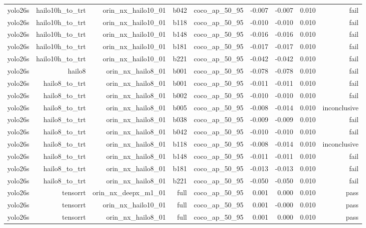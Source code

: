 \begin{table}[t]
\begin{tabular}{lrrrrrrrr}
yolo26s & hailo10h\_to\_trt & orin\_nx\_hailo10\_01 & b042 & coco\_ap\_50\_95 & -0.007 & -0.007 & 0.010 & fail \\
yolo26s & hailo10h\_to\_trt & orin\_nx\_hailo10\_01 & b118 & coco\_ap\_50\_95 & -0.010 & -0.010 & 0.010 & fail \\
yolo26s & hailo10h\_to\_trt & orin\_nx\_hailo10\_01 & b148 & coco\_ap\_50\_95 & -0.016 & -0.016 & 0.010 & fail \\
yolo26s & hailo10h\_to\_trt & orin\_nx\_hailo10\_01 & b181 & coco\_ap\_50\_95 & -0.017 & -0.017 & 0.010 & fail \\
yolo26s & hailo10h\_to\_trt & orin\_nx\_hailo10\_01 & b221 & coco\_ap\_50\_95 & -0.042 & -0.042 & 0.010 & fail \\
yolo26s & hailo8 & orin\_nx\_hailo8\_01 & b001 & coco\_ap\_50\_95 & -0.078 & -0.078 & 0.010 & fail \\
yolo26s & hailo8\_to\_trt & orin\_nx\_hailo8\_01 & b001 & coco\_ap\_50\_95 & -0.011 & -0.011 & 0.010 & fail \\
yolo26s & hailo8\_to\_trt & orin\_nx\_hailo8\_01 & b002 & coco\_ap\_50\_95 & -0.010 & -0.010 & 0.010 & fail \\
yolo26s & hailo8\_to\_trt & orin\_nx\_hailo8\_01 & b005 & coco\_ap\_50\_95 & -0.008 & -0.014 & 0.010 & inconclusive \\
yolo26s & hailo8\_to\_trt & orin\_nx\_hailo8\_01 & b038 & coco\_ap\_50\_95 & -0.009 & -0.009 & 0.010 & fail \\
yolo26s & hailo8\_to\_trt & orin\_nx\_hailo8\_01 & b042 & coco\_ap\_50\_95 & -0.010 & -0.010 & 0.010 & fail \\
yolo26s & hailo8\_to\_trt & orin\_nx\_hailo8\_01 & b118 & coco\_ap\_50\_95 & -0.008 & -0.014 & 0.010 & inconclusive \\
yolo26s & hailo8\_to\_trt & orin\_nx\_hailo8\_01 & b148 & coco\_ap\_50\_95 & -0.011 & -0.011 & 0.010 & fail \\
yolo26s & hailo8\_to\_trt & orin\_nx\_hailo8\_01 & b181 & coco\_ap\_50\_95 & -0.013 & -0.013 & 0.010 & fail \\
yolo26s & hailo8\_to\_trt & orin\_nx\_hailo8\_01 & b221 & coco\_ap\_50\_95 & -0.050 & -0.050 & 0.010 & fail \\
yolo26s & tensorrt & orin\_nx\_deepx\_m1\_01 & full & coco\_ap\_50\_95 & 0.001 & 0.000 & 0.010 & pass \\
yolo26s & tensorrt & orin\_nx\_hailo10\_01 & full & coco\_ap\_50\_95 & 0.001 & -0.000 & 0.010 & pass \\
yolo26s & tensorrt & orin\_nx\_hailo8\_01 & full & coco\_ap\_50\_95 & 0.001 & 0.000 & 0.010 & pass \\

\end{tabular}
\end{table}
